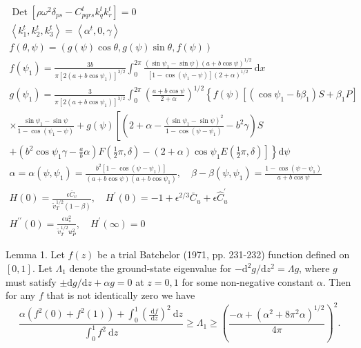\documentclass[12pt,a4paper]{article}
\begin{document}
\[
\begin{gathered}
\operatorname{Det}\left[\rho \omega^{2} \delta_{p s}-C_{p q r s}^{t} k_{q}^{t} k_{r}^{t}\right]=0 \\
\left\langle k_{1}^{t}, k_{2}^{t}, k_{3}^{t}\right\rangle=\left\langle\alpha^{t}, 0, \gamma\right\rangle \\
f(\theta, \psi)=(g(\psi) \cos \theta, g(\psi) \sin \theta, f(\psi)) \\
f\left(\psi_{1}\right)=\frac{3 b}{\pi\left[2\left(a+b \cos \psi_{1}\right)\right]^{3 / 2}} \int_{0}^{2 \pi} \frac{\left(\sin \psi_{1}-\sin \psi\right)(a+b \cos \psi)^{1 / 2}}{\left[1-\cos \left(\psi_{1}-\psi\right)\right](2+\alpha)^{1 / 2}} \mathrm{~d} x \\
g\left(\psi_{1}\right)=\frac{3}{\pi\left[2\left(a+b \cos \psi_{1}\right)\right]^{3 / 2}} \int_{0}^{2 \pi}\left(\frac{a+b \cos \psi}{2+\alpha}\right)^{1 / 2}\left\{f(\psi)\left[\left(\cos \psi_{1}-b \beta_{1}\right) S+\beta_{1} P\right]\right. \\
\times \frac{\sin \psi_{1}-\sin \psi}{1-\cos \left(\psi_{1}-\psi\right)}+g(\psi)\left[\left(2+\alpha-\frac{\left(\sin \psi_{1}-\sin \psi\right)^{2}}{1-\cos \left(\psi-\psi_{1}\right)}-b^{2} \gamma\right) S\right. \\
\left.\left.+\left(b^{2} \cos \psi_{1} \gamma-\frac{a}{b} \alpha\right) F\left(\frac{1}{2} \pi, \delta\right)-(2+\alpha) \cos \psi_{1} E\left(\frac{1}{2} \pi, \delta\right)\right]\right\} \mathrm{d} \psi \\
\alpha=\alpha\left(\psi, \psi_{1}\right)=\frac{b^{2}\left[1-\cos \left(\psi-\psi_{1}\right)\right]}{(a+b \cos \psi)\left(a+b \cos \psi_{1}\right)}, \quad \beta-\beta\left(\psi, \psi_{1}\right)=\frac{1-\cos \left(\psi-\psi_{1}\right)}{a+b \cos \psi} \\
H(0)=\frac{\epsilon \bar{C}_{v}}{\tilde{v}_{T}^{1 / 2}(1-\beta)}, \quad H^{\prime}(0)=-1+\epsilon^{2 / 3} \bar{C}_{u}+\epsilon \hat{C}_{u}^{\prime} \\
H^{\prime \prime}(0)=\frac{\epsilon u_{*}^{2}}{\tilde{v}_{T}^{1 / 2} u_{P}^{2}}, \quad H^{\prime}(\infty)=0
\end{gathered}
\]

Lemma 1. Let \(f(z)\) be a trial Batchelor (1971, pp. 231-232) function defined on \([0,1]\). Let \(\Lambda_{1}\) denote the ground-state eigenvalue for \(-\mathrm{d}^{2} g / \mathrm{d} z^{2}=\Lambda g\), where \(g\) must satisfy \(\pm \mathrm{d} g / \mathrm{d} z+\alpha g=0\) at \(z=0,1\) for some non-negative constant \(\alpha\). Then for any \(f\) that is not identically zero we have
\[
\frac{\alpha\left(f^{2}(0)+f^{2}(1)\right)+\int_{0}^{1}\left(\frac{\mathrm{~d} f}{\mathrm{~d} z}\right)^{2} \mathrm{~d} z}{\int_{0}^{1} f^{2} \mathrm{~d} z} \geq \Lambda_{1} \geq\left(\frac{-\alpha+\left(\alpha^{2}+8 \pi^{2} \alpha\right)^{1 / 2}}{4 \pi}\right)^{2} .
\]
\end{document}
